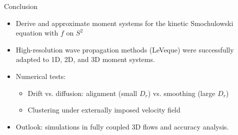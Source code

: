     \begin{frame}{Conclusion}
     \begin{itemize}
     	\item Derive and approximate moment systems for the kinetic Smochulowski equation with $f$ on $S^2$
     	\item High-resolution wave propagation methods (LeVeque) were successfully adapted to 1D, 2D, and 3D moment systems.
     	\item Numerical tests:
     	\begin{itemize}
     		\item Drift vs. diffusion: alignment (small $D_r$) vs. smoothing (large $D_r$)
     		\item Clustering under externally imposed velocity field
     	\end{itemize}
     	\item Outlook: simulations in fully coupled 3D flows and accuracy analysis.
     \end{itemize}
    \end{frame}


